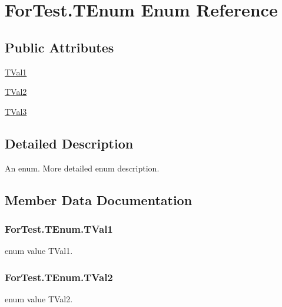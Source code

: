 \hypertarget{enum_for_test_1_1_t_enum}{}\section{For\+Test.\+T\+Enum Enum Reference}
\label{enum_for_test_1_1_t_enum}
\subsection*{Public Attributes}
\begin{DoxyCompactItemize}
\item 
\hyperlink{enum_for_test_1_1_t_enum_aaf0e64d3c42cf4bbdde34d97b8288e1f}{T\+Val1}
\item 
\hyperlink{enum_for_test_1_1_t_enum_adf6457875e3625275b970f46ca93eea9}{T\+Val2}
\item 
\hyperlink{enum_for_test_1_1_t_enum_a915448ba9d75f837e89122758dd4ad66}{T\+Val3}
\end{DoxyCompactItemize}


\subsection{Detailed Description}
An enum. More detailed enum description. 

\subsection{Member Data Documentation}
\hypertarget{enum_for_test_1_1_t_enum_aaf0e64d3c42cf4bbdde34d97b8288e1f}{}
\subsubsection[{T\+Val1}]{\setlength{\rightskip}{0pt plus 5cm}For\+Test.\+T\+Enum.\+T\+Val1}\label{enum_for_test_1_1_t_enum_aaf0e64d3c42cf4bbdde34d97b8288e1f}
enum value T\+Val1. \hypertarget{enum_for_test_1_1_t_enum_adf6457875e3625275b970f46ca93eea9}{}
\subsubsection[{T\+Val2}]{\setlength{\rightskip}{0pt plus 5cm}For\+Test.\+T\+Enum.\+T\+Val2}\label{enum_for_test_1_1_t_enum_adf6457875e3625275b970f46ca93eea9}
enum value T\+Val2. \hypertarget{enum_for_test_1_1_t_enum_a915448ba9d75f837e89122758dd4ad66}{}

